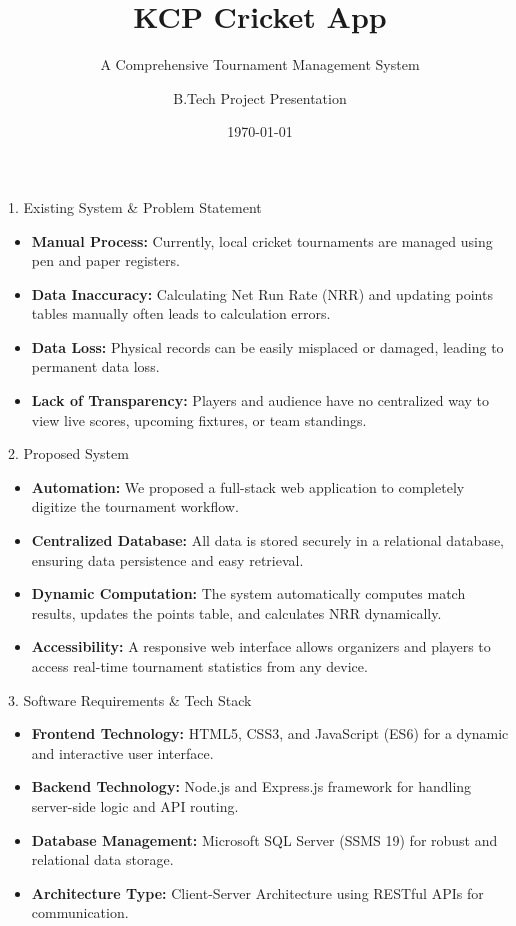 \documentclass[12pt]{beamer}
\title[KCP Cricket App]{KCP Cricket App}
\subtitle{A Comprehensive Tournament Management System}
\author{B.Tech Project Presentation}
\date{\today}
\begin{document}
\begin{frame}
    \titlepage
\end{frame}

\begin{frame}{1. Existing System \& Problem Statement}
    \begin{itemize}
        \item \textbf{Manual Process:} Currently, local cricket tournaments are managed using pen and paper registers.
        \item \textbf{Data Inaccuracy:} Calculating Net Run Rate (NRR) and updating points tables manually often leads to calculation errors.
        \item \textbf{Data Loss:} Physical records can be easily misplaced or damaged, leading to permanent data loss.
        \item \textbf{Lack of Transparency:} Players and audience have no centralized way to view live scores, upcoming fixtures, or team standings.
    \end{itemize}
\end{frame}

\begin{frame}{2. Proposed System}
    \begin{itemize}
        \item \textbf{Automation:} We proposed a full-stack web application to completely digitize the tournament workflow.
        \item \textbf{Centralized Database:} All data is stored securely in a relational database, ensuring data persistence and easy retrieval.
        \item \textbf{Dynamic Computation:} The system automatically computes match results, updates the points table, and calculates NRR dynamically.
        \item \textbf{Accessibility:} A responsive web interface allows organizers and players to access real-time tournament statistics from any device.
    \end{itemize}
\end{frame}

\begin{frame}{3. Software Requirements \& Tech Stack}
    \begin{itemize}
        \item \textbf{Frontend Technology:} HTML5, CSS3, and JavaScript (ES6) for a dynamic and interactive user interface.
        \item \textbf{Backend Technology:} Node.js and Express.js framework for handling server-side logic and API routing.
        \item \textbf{Database Management:} Microsoft SQL Server (SSMS 19) for robust and relational data storage.
        \item \textbf{Architecture Type:} Client-Server Architecture using RESTful APIs for communication.
    \end{itemize}
\end{frame}
\end{document}
